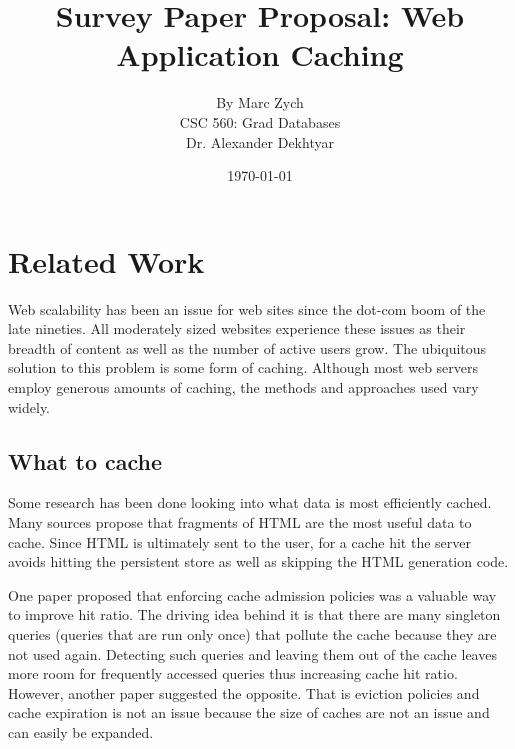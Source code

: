 \documentclass[12pt]{article}
\begin{document}
\title{\vfill Survey Paper Proposal: Web Application Caching}

\author{
By Marc Zych \vspace{10pt} \\
CSC 560: Grad Databases \vspace{10pt} \\
Dr. Alexander Dekhtyar \vspace{10pt} \\
}
\date{\today}

\maketitle


\thispagestyle{empty}
\newpage



\section{Related Work}
Web scalability has been an issue for web sites since the dot-com boom of the late nineties.
All moderately sized websites experience these issues as their breadth of content as well as the number of active users grow.
The ubiquitous solution to this problem is some form of caching.
Although most web servers employ generous amounts of caching, the methods and approaches used vary widely.

\subsection{What to cache}
Some research has been done looking into what data is most efficiently cached.
Many sources propose that fragments of HTML are the most useful data to cache. \cite{comparisonOfCachingSolutions} \cite{scalableConsistentCaching}
Since HTML is ultimately sent to the user, for a cache hit the server avoids hitting the persistent store as well as skipping the HTML generation code. \cite{howBasecampGotSoFast}

One paper proposed that enforcing cache admission policies was a valuable way to improve hit ratio. \cite{cacheAdmissionPolicies}
The driving idea behind it is that there are many singleton queries (queries that are run only once) that pollute the cache because they are not used again.
Detecting such queries and leaving them out of the cache leaves more room for frequently accessed queries thus increasing cache hit ratio.
However, another paper suggested the opposite.
That is eviction policies and cache expiration is not an issue because the size of caches are not an issue and can easily be expanded. \cite{refreshingPerspectiveSearch}
\end{document}
